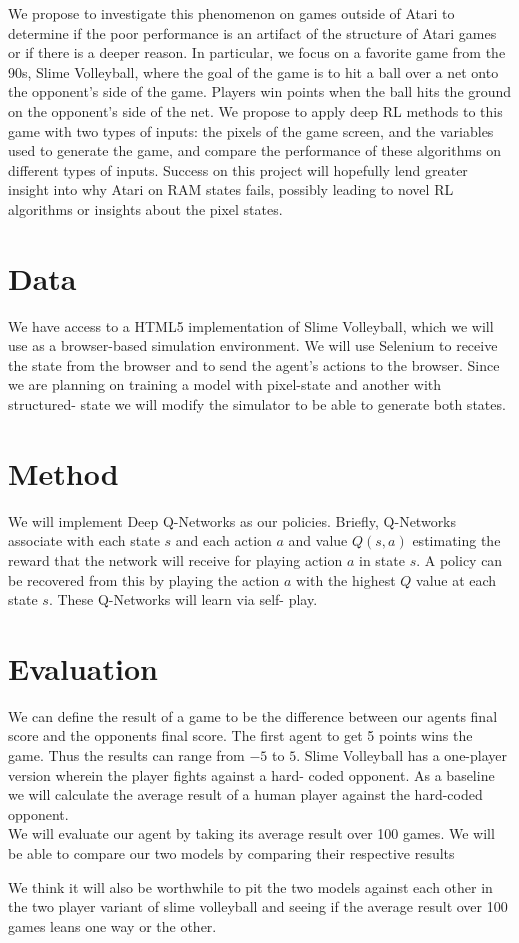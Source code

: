 \documentclass[10pt,twocolumn,letterpaper]{article}
\begin{document}
We propose to investigate this phenomenon on games outside of Atari to determine
if the poor performance is an artifact of the structure of Atari games or if
there is a deeper reason. In particular, we focus on a favorite game from the
90s, Slime Volleyball, where the goal of the game is to hit a ball over a net
onto the opponent's side of the game. Players win points when the ball hits the
ground on the opponent's side of the net. We propose to apply deep RL methods to
this game with two types of inputs: the pixels of the game screen, and the
variables used to generate the game, and compare the performance of these
algorithms on different types of inputs. Success on this project will hopefully
lend greater insight into why Atari on RAM states fails, possibly leading to
novel RL algorithms or insights about the pixel states.


\section{Data}

We have access to a HTML5 implementation of Slime Volleyball, which we will use
as a browser-based simulation environment. We will use Selenium to receive the
state from the browser and to send the agent's actions to the browser. Since we
are planning on training a model with pixel-state and another with structured-
state we will modify the simulator to be able to generate both states.

\section{Method} We will implement Deep Q-Networks as our policies. Briefly,
Q-Networks associate with each state $s$ and each action $a$ and value $Q(s, a)$
estimating the reward that the network will receive for playing action $a$ in
state $s$. A policy can be recovered from this by playing the action $a$ with
the highest $Q$ value at each state $s$. These Q-Networks will learn via self-
play.

\section{Evaluation} We can define the result of a game to be the difference
between our agents final score and the opponents final score. The first agent to
get 5 points wins the game. Thus the results can range from $-5$ to $5$. Slime
Volleyball has a one-player version wherein the player fights against a hard-
coded opponent. As a baseline we will calculate the average result of a human
player against the hard-coded opponent. \\

\noindent We will evaluate our agent by taking its average result over 100
games. We will be able to compare our two models by comparing their respective
results

\noindent We think it will also be worthwhile to pit the two models against each
other in the two player variant of slime volleyball and seeing if the average
result over 100 games leans one way or the other.



{\small


}
\end{document}
